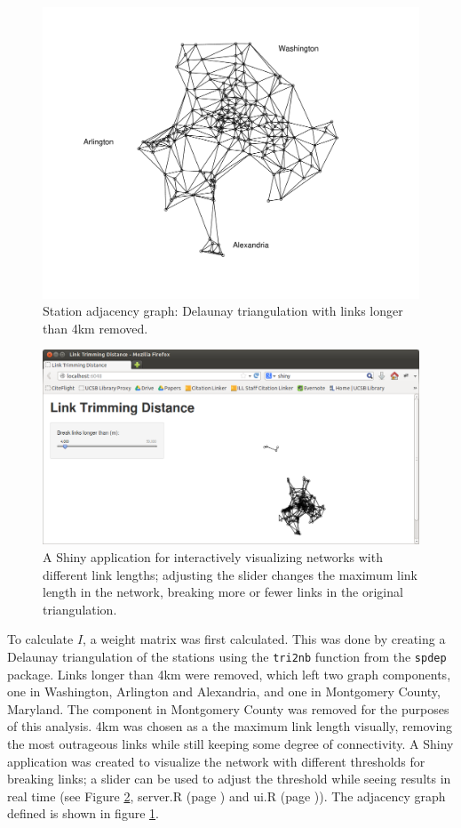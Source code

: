 \documentclass[letterpaper,11pt]{article}
\newcommand{\reflst}[1]{#1 (page \pageref{#1})}
\begin{document}
\begin{figure}[t]
  \includegraphics[width=\textwidth]{connectivity_labels.pdf}
  \caption{\label{fig:nbmat} Station adjacency graph: Delaunay triangulation with links
    longer than 4km removed.}
\end{figure}

\begin{figure}[t]
  \includegraphics[width=\textwidth]{shiny.png}
  \caption{\label{fig:shiny} A Shiny application for interactively
    visualizing networks with different link lengths; adjusting the
    slider changes the maximum link length in the network, breaking
    more or fewer links in the original triangulation.}
\end{figure}


To calculate $I$, a weight matrix was first calculated. This was done
by creating a Delaunay triangulation of the stations using the
\texttt{tri2nb} function from the \texttt{spdep} package. Links longer
than 4km were removed, which left two graph components, one in
Washington, Arlington and Alexandria, and one in Montgomery County,
Maryland. The component in Montgomery County was removed for the
purposes of this analysis. 4km was chosen as a the maximum link length
visually, removing the most outrageous links while still keeping some
degree of connectivity. A Shiny application was created to visualize the
network with different thresholds for breaking links; a slider can be
used to adjust the threshold while seeing results in real time (see
Figure \ref{fig:shiny}, \reflst{server.R} and \reflst{ui.R}). The
adjacency graph defined is shown in figure \ref{fig:nbmat}.
\end{document}
